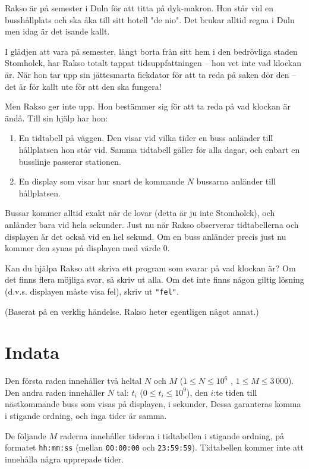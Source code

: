 Rakso är på semester i Duln för att titta på dyk-makron. Hon står vid en busshållplats och ska åka till sitt hotell "de nio". Det brukar alltid regna i Duln men idag är det isande kallt.

I glädjen att vara på semester, långt borta från sitt hem i den bedrövliga staden Stomholck, har Rakso totalt tappat tidsuppfattningen -- hon vet inte vad klockan är. När hon tar upp sin jättesmarta fickdator för att ta reda på saken dör den -- det är för kallt ute för att den ska fungera!

Men Rakso ger inte upp. Hon bestämmer sig för att ta reda på vad klockan är ändå. Till sin hjälp har hon:
\begin{enumerate}
  \item En tidtabell på väggen. Den visar vid vilka tider en buss anländer till hållplatsen hon står vid.
    Samma tidtabell gäller för alla dagar, och enbart en busslinje passerar stationen.
  \item En display som visar hur snart de kommande $N$ bussarna anländer till hållplatsen.
\end{enumerate}
Bussar kommer alltid exakt när de lovar (detta är ju inte Stomholck), och anländer bara vid hela sekunder. Just nu när Rakso observerar tidtabellerna och displayen är det också vid en hel sekund. Om en buss anländer precis just nu kommer den synas på displayen med värde $0$.

Kan du hjälpa Rakso att skriva ett program som svarar på vad klockan är? Om det finns flera möjliga svar, så skriv ut alla.
Om det inte finns någon giltig lösning (d.v.s. displayen måste visa fel), skriv ut \texttt{"fel"}.

(Baserat på en verklig händelse. Rakso heter egentligen något annat.)

\section*{Indata}
Den första raden innehåller två heltal $N$ och $M$ ($1 \leq N \leq 10^6$ , $1 \leq M \leq 3\,000$).
Den andra raden innehåller $N$ tal: $t_i$ ($0 \le t_i \le 10^9$), den $i$:te tiden till nästkommande buss som visas på displayen, i sekunder.
Dessa garanteras komma i stigande ordning, och inga tider är samma.

De följande $M$ raderna innehåller tiderna i tidtabellen i stigande ordning, på formatet \texttt{hh:mm:ss} (mellan \texttt{00:00:00} och \texttt{23:59:59}).
Tidtabellen kommer inte att innehålla några upprepade tider.

